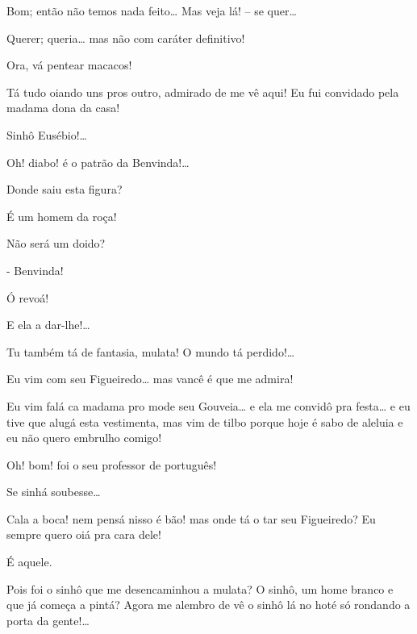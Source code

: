 Bom; então não temos nada feito\ldots{} Mas veja lá! -- se quer\ldots{}

 Querer; queria\ldots{} mas não com caráter definitivo!

 Ora, vá pentear macacos!


  Tá tudo
oiando uns pros outro, admirado de me vê aqui! Eu fui convidado pela madama dona
da casa!

  Sinhô Eusébio!\ldots{}

  Oh! diabo! é o patrão
da Benvinda!\ldots{}

 Donde saiu esta figura?

 É um homem da roça!

 Não será um doido?

  -
Benvinda!

 Ó revoá!

  E ela a dar-lhe!\ldots{}

 Tu também tá de fantasia, mulata! O mundo tá perdido!\ldots{}

 Eu vim com seu Figueiredo\ldots{} mas vancê é que me admira!

 Eu vim falá ca madama pro mode seu Gouveia\ldots{} e ela me convidô
pra festa\ldots{} e eu tive que alugá esta vestimenta, mas vim de tilbo porque hoje
é sabo de aleluia e eu não quero embrulho comigo!

  Oh! bom! foi o seu professor de português!

 Se sinhá soubesse\ldots{}

 Cala a boca! nem pensá nisso é bão! mas onde tá o tar seu
Figueiredo? Eu sempre quero oiá pra cara dele!

 É aquele.

  Pois foi o sinhô que me desencaminhou a
mulata? O sinhô, um home branco e que já começa a pintá? Agora me alembro de vê o
sinhô lá no hoté só rondando a porta da gente!\ldots{}


